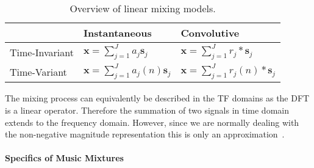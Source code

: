\begin{table}[]
    \centering
\begin{longtable}[]{lll}
\toprule
\begin{minipage}[b]{0.26\columnwidth}\raggedright
\strut
\end{minipage} & \begin{minipage}[b]{0.42\columnwidth}\raggedright
Instantaneous\strut
\end{minipage} & \begin{minipage}[b]{0.23\columnwidth}\raggedright
Convolutive\strut
\end{minipage}\tabularnewline
\midrule
\endhead
\begin{minipage}[t]{0.26\columnwidth}\raggedright
Time-Invariant\strut
\end{minipage} & \begin{minipage}[t]{0.42\columnwidth}\raggedright
\(\mathbf{x}=\sum_{j=1}^{J}a_j\mathbf{s}_j\)\strut
\end{minipage} & \begin{minipage}[t]{0.23\columnwidth}\raggedright
\(\mathbf{x} = \sum_{j=1}^{J}r_{j} \ast \mathbf{s}_j\)\strut
\end{minipage}\tabularnewline
\begin{minipage}[t]{0.26\columnwidth}\raggedright
Time-Variant\strut
\end{minipage} & \begin{minipage}[t]{0.42\columnwidth}\raggedright
\(\mathbf{x}=\sum_{j=1}^{J}a_j(n)\mathbf{s}_j\)\strut
\end{minipage} & \begin{minipage}[t]{0.23\columnwidth}\raggedright
\(\mathbf{x} = \sum_{j=1}^{J}r_{j}(n) \ast \mathbf{s}_j\)\strut
\end{minipage}\tabularnewline
\bottomrule
\end{longtable}
    \caption{Overview of linear mixing models.}
    \label{tab:mixing_models}
\end{table}

The mixing process can equivalently be described in the TF domains as the {DFT} is a linear operator.
Therefore the summation of two signals in time domain extends to the frequency domain.
However, since we are normally dealing with the non-negative magnitude representation this is only an approximation~\cite{klapuri06}.

\paragraph{Specifics of Music Mixtures}
\label{par:specifics_of_music_mixtures}

